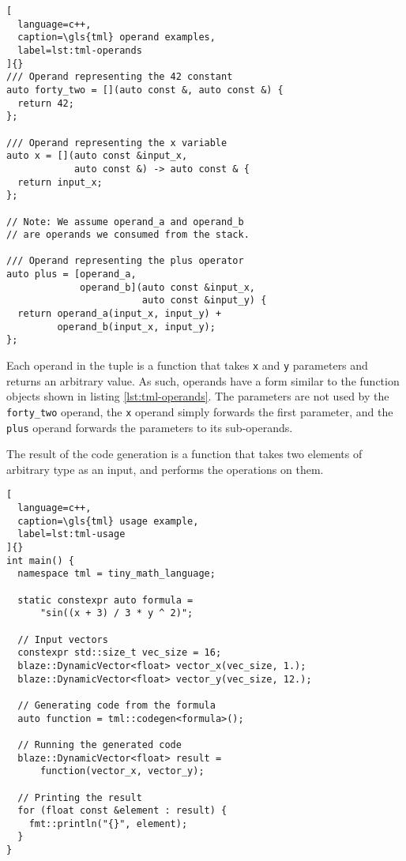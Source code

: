 \documentclass[../main]{subfiles}
\begin{document}
\begin{lstlisting}[
  language=c++,
  caption=\gls{tml} operand examples,
  label=lst:tml-operands
]{}
/// Operand representing the 42 constant
auto forty_two = [](auto const &, auto const &) {
  return 42;
};

/// Operand representing the x variable
auto x = [](auto const &input_x,
            auto const &) -> auto const & {
  return input_x;
};

// Note: We assume operand_a and operand_b
// are operands we consumed from the stack.

/// Operand representing the plus operator
auto plus = [operand_a,
             operand_b](auto const &input_x,
                        auto const &input_y) {
  return operand_a(input_x, input_y) +
         operand_b(input_x, input_y);
};
\end{lstlisting}

Each operand in the tuple is a function that takes \lstinline{x} and
\lstinline{y} parameters and returns an arbitrary value.
As such, operands have a form similar to the function
objects shown in listing \ref{lst:tml-operands}.
The parameters are not used by the \lstinline{forty_two} operand,
the \lstinline{x} operand simply forwards the first parameter,
and the \lstinline{plus} operand forwards the parameters to its sub-operands.

The result of the code generation is a function that takes two elements of
arbitrary type as an input, and performs the operations on them.

\begin{lstlisting}[
  language=c++,
  caption=\gls{tml} usage example,
  label=lst:tml-usage
]{}
int main() {
  namespace tml = tiny_math_language;

  static constexpr auto formula =
      "sin((x + 3) / 3 * y ^ 2)";

  // Input vectors
  constexpr std::size_t vec_size = 16;
  blaze::DynamicVector<float> vector_x(vec_size, 1.);
  blaze::DynamicVector<float> vector_y(vec_size, 12.);

  // Generating code from the formula
  auto function = tml::codegen<formula>();

  // Running the generated code
  blaze::DynamicVector<float> result =
      function(vector_x, vector_y);

  // Printing the result
  for (float const &element : result) {
    fmt::println("{}", element);
  }
}
\end{lstlisting}
\end{document}
